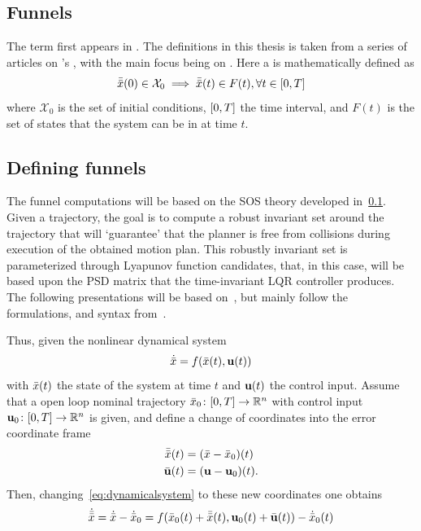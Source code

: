\subsection{Funnels}
\label{sec:Funnels}

The term \funnel{} first appears in \cite{masonMechanicsManipulation1985}. The
\funnel{} definitions in this thesis is taken from a series of articles on
\funnel{}'s \cite{Tobenkin_2011} \cite{tedrakeLQRtreesFeedbackMotion2009,
  majumdarRobustOnlineMotion2013,
  majumdarFunnelLibrariesRealtime2017,ahmadi2014dsos}, with the main focus being
on \cite{majumdarFunnelLibrariesRealtime2017}. Here a \funnel{} is
mathematically defined as
\[
  \bar{\bar{x}}(0) \in \mathcal{X}_0 \implies \bar{\bar{x}}(t) \in F(t), \forall t \in
  \lbrack0,T\rbrack
\]
where \(\mathcal{X}_0\) is the set of initial conditions, \(\lbrack0,T\rbrack\) the time
interval, and \(F(t)\) is the set of states that the system can be in at time
\(t\).

\subsection{Defining funnels}

The funnel computations will be based on the \ac{SOS} theory developed
in~\cref{sec:Funnels}. Given a trajectory, the goal is to compute a robust
invariant set around the trajectory that will `guarantee' that the planner is
free from collisions during execution of the obtained motion plan. This robustly
invariant set is parameterized through Lyapunov function candidates, that, in
this case, will be based upon the \ac{PSD} matrix that the time-invariant
\ac{LQR} controller produces. The following presentations will be based
on~\cite{Tobenkin_2011, tedrakeLQRtreesFeedbackMotion2009,
  majumdarRobustOnlineMotion2013}, but mainly follow the formulations, and
syntax from~\cite{majumdarFunnelLibrariesRealtime2017}.

Thus, given the nonlinear dynamical system
\begin{equation}
  \label{eq:dynamicalsystem}
  \dot{\bar{x}} = f(\bar{x}(t), \mathbf{u}(t))
\end{equation}
with \(\bar{x}(t)\) the state of the system at time \(t\) and \(\mathbf{u}(t)\) the control
input. Assume that a open loop nominal trajectory \(\bar{x}_0 \colon [0,T]
\rightarrow \mathbb{R}^n\) with control input \(\mathbf{u}_0 \colon [0,T] \rightarrow \mathbb{R}^n\) is
given, and define a change of coordinates into the error coordinate frame
\begin{align}
  \bar{\bar{x}}(t) &= (\bar{x} - \bar{x}_0)(t) \\
  \bar{\mathbf{u}}(t) &= (\mathbf{u} - \mathbf{u}_0)(t).
\end{align}
Then, changing~\cref{eq:dynamicalsystem} to these new coordinates one obtains
\begin{equation}
  \label{eq:dynamicalsystem-coordinatechange}
  \dot{\bar{\bar{x}}} = \dot{\bar{x}} - \dot{\bar{x}}_0 = f(\bar{x}_0(t) + \bar{\bar{x}}(t), \mathbf{u}_0(t) + \bar{\mathbf{u}}(t)) - \dot{\bar{x}}_0(t)
\end{equation}

